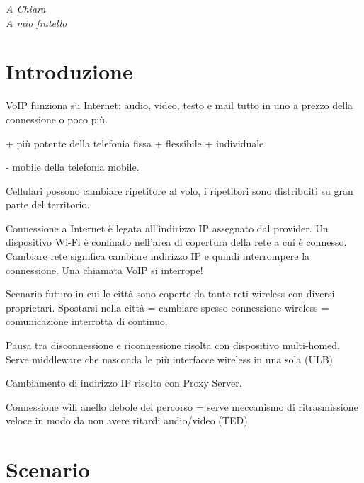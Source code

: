 \documentclass[12pt,a4paper,openright,twoside]{book}
\begin{document}
%
%
\begin{titlepage}
  \thispagestyle{empty}
  \topmargin=6.5cm
  \raggedleft
  \large
  \em A Chiara\\
  A mio fratello
\end{titlepage}


\chapter*{Introduzione}
VoIP funziona su Internet: audio, video, testo e mail tutto in uno a
prezzo della connessione o poco più.

+ più potente della telefonia fissa
+ flessibile
+ individuale

- mobile della telefonia mobile.

Cellulari possono cambiare ripetitore al volo, i ripetitori sono distribuiti
su gran parte del territorio.

Connessione a Internet è legata all'indirizzo IP assegnato dal provider.
Un dispositivo Wi-Fi è confinato nell'area di copertura della rete a cui è
connesso. Cambiare rete significa cambiare indirizzo IP e quindi
interrompere la connessione. Una chiamata VoIP si interrope!

Scenario futuro in cui le città sono coperte da tante reti wireless con
diversi proprietari. Spostarsi nella città = cambiare spesso connessione
wireless = comunicazione interrotta di continuo.

Pausa tra disconnessione e riconnessione risolta con dispositivo
multi-homed. Serve middleware che nasconda le più interfacce wireless in una
sola (ULB)

Cambiamento di indirizzo IP risolto con Proxy Server.

Connessione wifi anello debole del percorso = serve meccanismo di
ritrasmissione veloce in modo da non avere ritardi audio/video (TED)

\tableofcontents
\rhead[\fancyplain{}{\bfseries\leftmark}]{\fancyplain{}{\bfseries\thepage}}

\chapter{Scenario}
\lhead[\fancyplain{}{\bfseries\thepage}]{\fancyplain{}{\bfseries\rightmark}}
\end{document}
